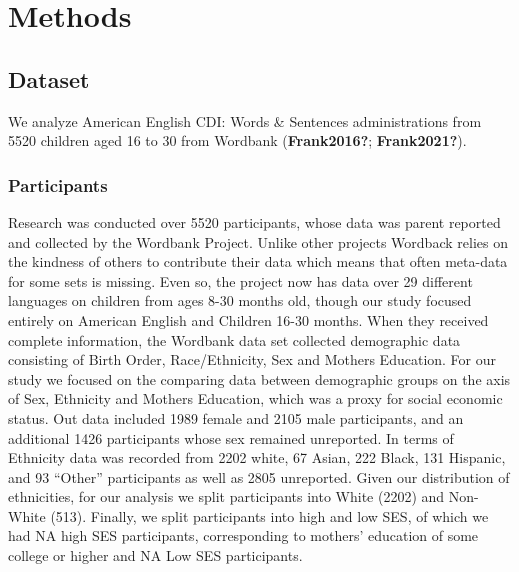 \documentclass[10pt, letterpaper]{article}
\begin{document}
\hypertarget{methods}{%
\section{Methods}\label{methods}}

\hypertarget{dataset}{%
\subsection{Dataset}\label{dataset}}

We analyze American English CDI: Words \& Sentences administrations from
5520 children aged 16 to 30 from Wordbank (\textbf{Frank2016?};
\textbf{Frank2021?}).

\hypertarget{participants}{%
\subsubsection{Participants}\label{participants}}

Research was conducted over 5520 participants, whose data was parent
reported and collected by the Wordbank Project. Unlike other projects
Wordback relies on the kindness of others to contribute their data which
means that often meta-data for some sets is missing. Even so, the
project now has data over 29 different languages on children from ages
8-30 months old, though our study focused entirely on American English
and Children 16-30 months. When they received complete information, the
Wordbank data set collected demographic data consisting of Birth Order,
Race/Ethnicity, Sex and Mothers Education. For our study we focused on
the comparing data between demographic groups on the axis of Sex,
Ethnicity and Mothers Education, which was a proxy for social economic
status. Out data included 1989 female and 2105 male participants, and an
additional 1426 participants whose sex remained unreported. In terms of
Ethnicity data was recorded from 2202 white, 67 Asian, 222 Black, 131
Hispanic, and 93 ``Other'' participants as well as 2805 unreported.
Given our distribution of ethnicities, for our analysis we split
participants into White (2202) and Non-White (513). Finally, we split
participants into high and low SES, of which we had NA high SES
participants, corresponding to mothers' education of some college or
higher and NA Low SES participants.


\end{document}
